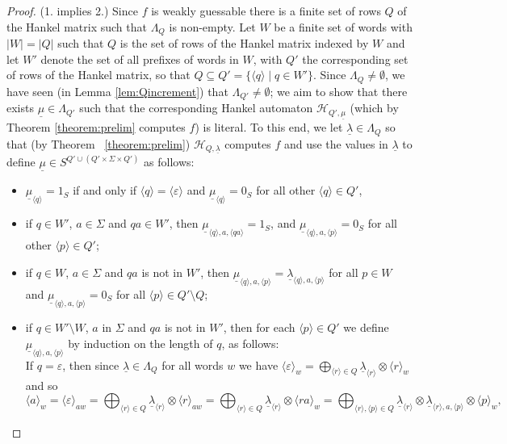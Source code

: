 \documentclass[10pt,a4paper]{amsart}
\theoremstyle{definition}
\numberwithin{equation}{section}
\numberwithin{theorem}{section}
\begin{document}
\begin{proof}
	(1. implies 2.) Since $f$ is weakly guessable there is a finite set of rows $Q$ of the Hankel matrix such that $\Lambda_Q$ is non-empty. Let $W$ be a finite set of words with $|W|=|Q|$ such that $Q$ is the set of rows of the Hankel matrix indexed by $W$ and let $W'$ denote the set of all prefixes of words in $W$,  with $Q'$ the corresponding set of rows of the Hankel matrix, so that $Q \subseteq Q' = \{\langle q \rangle \mid q \in W'\}$. Since $\Lambda_Q \neq \emptyset$, we have seen (in Lemma \ref{lem:Qincrement}) that $\Lambda_{Q'} \neq \emptyset$; we aim to show that there exists $\underline{\mu} \in \Lambda_{Q'}$ such that the corresponding Hankel automaton $\mathcal{H}_{Q', \underline{\mu}}$ (which by Theorem \ref{theorem:prelim} computes $f$) is literal. To this end, we  let $\underline{\lambda} \in \Lambda_Q$ so that (by Theorem ~\ref{theorem:prelim}) $\mathcal{H}_{Q,\underline{\lambda}}$ computes $f$ and use the values in $\underline{\lambda}$ to define $\underline{\mu} \in S^{Q' \cup (Q' \times \Sigma \times Q')}$ as follows:
	\begin{itemize}
		\item $\underline{\mu}_{\langle q \rangle} = 1_S$ if and only if $\langle q \rangle =\langle \varepsilon \rangle$ and $\underline{\mu}_{\langle q \rangle} = 0_S$ for all other  $\langle q \rangle  \in Q'$,
		\item if $q \in W'$, $a \in \Sigma$ and $qa \in W'$, then $\underline{\mu}_{\langle q \rangle, a ,\langle qa\rangle} = 1_S$, and $\underline{\mu}_{\langle q \rangle,a,\langle p\rangle} = 0_S$ for all other $\langle p \rangle \in Q'$;
		\item if $q  \in W$, $a \in \Sigma$ and $qa$ is not in $W'$, then $\underline{\mu}_{\langle q \rangle ,a, \langle p\rangle } = \underline{\lambda}_{\langle q \rangle ,a,\langle p\rangle }$ for all $p \in W$ and $\underline{\mu}_{\langle q \rangle ,a,\langle p\rangle} = 0_S$ for all $\langle p \rangle \in Q' \setminus Q$;
		\item if $q \in W' \setminus W$, $a$ in $\Sigma$ and $qa$ is not in $W'$, then for each $\langle p \rangle \in Q'$ we define $\underline{\mu}_{\langle q \rangle ,a,\langle p \rangle}$ by induction on the length of $q$, as follows:\\
		If $q = \varepsilon$, then since $\underline{\lambda} \in \Lambda_Q$ for all words $w$ we have $\langle \varepsilon \rangle_w = \bigoplus_{\langle r \rangle \in Q} \underline{\lambda}_{\langle r \rangle} \otimes \langle r \rangle_w$ and so \[\langle a \rangle_w = \langle \varepsilon \rangle_{aw} =  \bigoplus_{\langle r \rangle \in Q} \underline{\lambda}_{\langle r \rangle} \otimes \langle r \rangle_{aw} =  \bigoplus_{\langle r \rangle \in Q} \underline{\lambda}_{\langle r \rangle} \otimes \langle ra \rangle_w =  \bigoplus_{\langle r \rangle, \langle p \rangle  \in Q} \underline{\lambda}_{\langle r \rangle} \otimes \underline{\lambda}_{\langle r \rangle ,a, \langle p \rangle} \otimes \langle p \rangle_w,\]

\end{itemize}
\end{proof}
\end{document}
